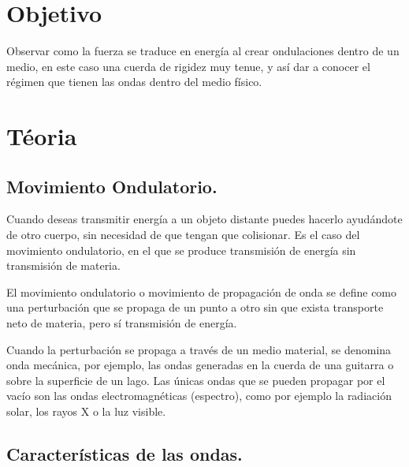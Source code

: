 \documentclass[11pt]{article}
\begin{document}
\begin{multicols}{2}

\section{Objetivo}
	Observar como la fuerza se traduce en energía al crear ondulaciones dentro de un medio, en este caso una cuerda de rigidez muy tenue, y así dar a conocer el régimen que tienen las ondas dentro del medio físico.
\section{Téoria}

		\subsection{Movimiento Ondulatorio.}
				
				Cuando deseas transmitir energía a un objeto distante puedes hacerlo ayudándote de otro cuerpo, sin necesidad de que tengan que colisionar.  Es el caso del movimiento ondulatorio, en el que se produce transmisión de energía sin transmisión de materia.

				El movimiento ondulatorio o movimiento de propagación de onda se define como una perturbación que se propaga de un punto a otro sin que exista transporte neto de materia, pero sí transmisión de energía.

				Cuando la perturbación se propaga a través de un medio material, se denomina onda mecánica, por ejemplo, las ondas generadas en la cuerda de una guitarra o sobre la superficie de un lago. Las únicas ondas que se pueden propagar por el vacío son las ondas electromagnéticas (espectro), como por ejemplo la radiación solar, los rayos X o la luz visible.

		\subsection{Características de las ondas.}

				\begin{itemize}
				

\end{itemize}
\end{multicols}
\end{document}
